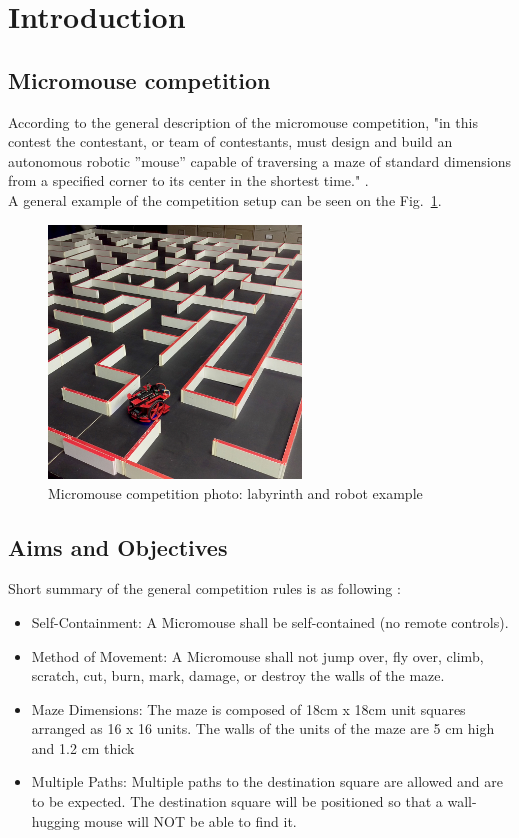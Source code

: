 
\section{Introduction}

\subsection{Micromouse competition}

According to the general description of the micromouse competition, "in this contest the contestant, or team of contestants, must design and build an autonomous robotic ”mouse” capable of traversing a maze of standard dimensions from a specified corner to its center in the shortest time." \cite{MicromouseRules}.\\
A general example of the competition setup can be seen on the Fig.~\ref{fig:micromouse}. 
\begin{figure}[htb]
    \centering
    \includegraphics[width=0.6\textwidth]{figures/micromouse-maze.jpg}
    \caption{Micromouse competition photo: labyrinth and robot example \cite{MicromousePhotoLink}}
    \label{fig:micromouse}
\end{figure}

\subsection{Aims and Objectives}

    Short summary of the general competition rules is as following \cite{MicromouseRules}:

\begin{itemize}
    \item Self-Containment: A Micromouse shall be self-contained (no remote controls).
    \item Method of Movement: A Micromouse shall not jump over, fly over, climb, scratch, cut, burn, mark, damage, or destroy the walls of the maze.
    \item Maze Dimensions: The maze is composed of 18cm x 18cm unit squares arranged as 16 x 16 units. The walls of the units of the maze are 5 cm high and 1.2 cm thick 
    \item Multiple Paths: Multiple paths to the destination square are allowed and are to be expected. The destination square will be positioned so that a wall-hugging mouse will NOT be able to find it.
\end{itemize}
    
